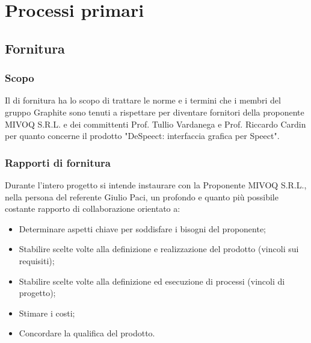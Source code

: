 \documentclass[../NormediProgetto.tex]{subfiles}
\begin{document}
	
	
\chapter{Processi primari}


\section{Fornitura}


\subsection{Scopo}

Il  di fornitura ha lo scopo di trattare le norme e i termini che i membri del gruppo Graphite sono tenuti a rispettare per diventare fornitori della proponente MIVOQ S.R.L. e dei committenti Prof. Tullio Vardanega e Prof. Riccardo Cardin per quanto concerne il prodotto "DeSpeect: interfaccia grafica per Speect".



\subsection{Rapporti di fornitura}

Durante l'intero progetto si intende instaurare con la Proponente MIVOQ S.R.L., nella persona del referente Giulio Paci, un profondo e quanto più possibile costante rapporto di collaborazione orientato a:

\begin{itemize}

    \item Determinare aspetti chiave per soddisfare i bisogni del proponente;
    
    \item Stabilire scelte volte alla definizione e realizzazione del prodotto (vincoli sui requisiti);
    
    \item Stabilire scelte volte alla definizione ed esecuzione di processi (vincoli di progetto);
    
    \item Stimare i costi;
    
    \item Concordare la qualifica del prodotto.

\end{itemize}
\end{document}
